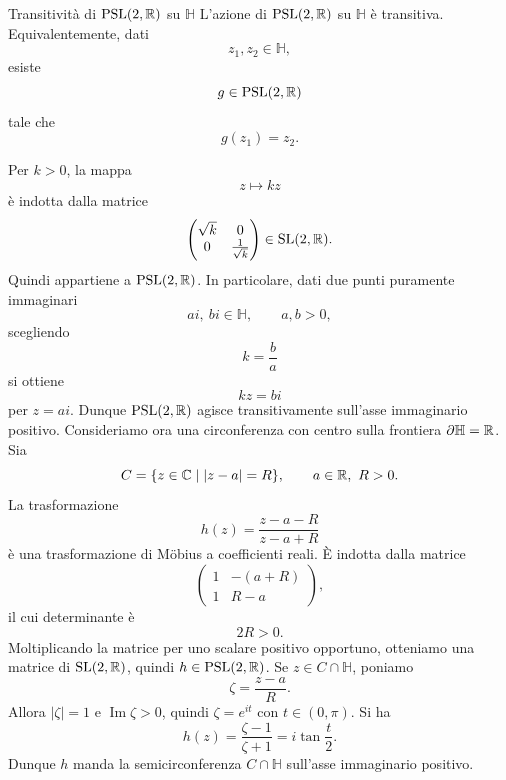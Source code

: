 \documentclass[a4paper]{article}
\begin{document}
\begin{snippetproposition}{Transitività di \(\operatorname{PSL}(2,\mathbb{R})\) su \(\mathbb{H}\)}
    L'azione di \(\operatorname{PSL}(2,\mathbb{R})\) su \(\mathbb{H}\) è transitiva. Equivalentemente, dati
    \[
        z_1,z_2\in\mathbb{H},
    \]
    esiste
    \[
        g\in\operatorname{PSL}(2,\mathbb{R})
    \]
    tale che
    \[
        g(z_1)=z_2.
    \]
\end{snippetproposition}

\begin{snippetproof}{}
    Per \(k>0\), la mappa
    \[
        z\longmapsto kz
    \]
    è indotta dalla matrice
    \[
        \begin{pmatrix}
            \sqrt{k} & 0\\
            0 & \frac{1}{\sqrt{k}}
        \end{pmatrix}
        \in\operatorname{SL}(2,\mathbb{R}).
    \]
    Quindi appartiene a \(\operatorname{PSL}(2,\mathbb{R})\). In particolare, dati due punti puramente immaginari
    \[
        ai,\ bi\in\mathbb{H},
        \qquad a,b>0,
    \]
    scegliendo
    \[
        k=\frac{b}{a}
    \]
    si ottiene
    \[
        kz=bi
    \]
    per \(z=ai\). Dunque \(\operatorname{PSL}(2,\mathbb{R})\) agisce transitivamente sull'asse immaginario positivo.
    Consideriamo ora una circonferenza con centro sulla frontiera \(\partial\mathbb{H}=\mathbb{R}\). Sia
    \[
        C=\{z\in\mathbb{C}\mid |z-a|=R\},
        \qquad a\in\mathbb{R},\ R>0.
    \]
    La trasformazione
    \[
        h(z)=\frac{z-a-R}{z-a+R}
    \]
    è una trasformazione di Möbius a coefficienti reali. È indotta dalla matrice
    \[
        \begin{pmatrix}
            1 & -(a+R)\\
            1 & R-a
        \end{pmatrix},
    \]
    il cui determinante è
    \[
        2R>0.
    \]
    Moltiplicando la matrice per uno scalare positivo opportuno, otteniamo una matrice di \(\operatorname{SL}(2,\mathbb{R})\), quindi \(h\in\operatorname{PSL}(2,\mathbb{R})\).
    Se \(z\in C\cap\mathbb{H}\), poniamo
    \[
        \zeta=\frac{z-a}{R}.
    \]
    Allora \(|\zeta|=1\) e \(\operatorname{Im}\zeta>0\), quindi \(\zeta=e^{it}\) con \(t\in(0,\pi)\). Si ha
    \[
        h(z)=\frac{\zeta-1}{\zeta+1}
        =
        i\tan\frac{t}{2}.
    \]
    Dunque \(h\) manda la semicirconferenza \(C\cap\mathbb{H}\) sull'asse immaginario positivo.

\end{snippetproof}
\end{document}
